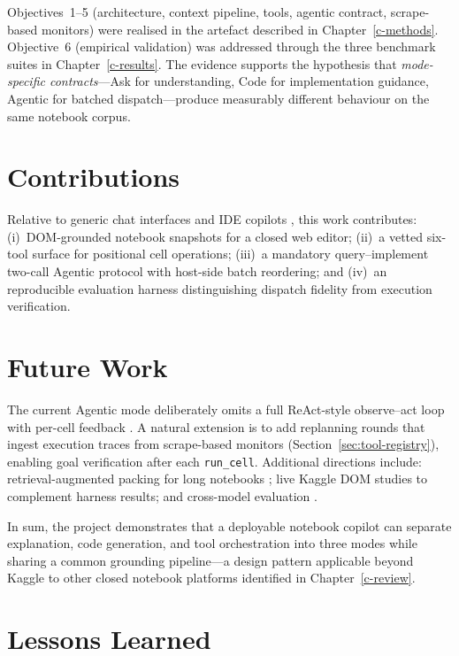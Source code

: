 Objectives~1--5 (architecture, context pipeline, tools, agentic contract, scrape-based monitors) were realised in the artefact described in Chapter~\ref{c-methods}. Objective~6 (empirical validation) was addressed through the three benchmark suites in Chapter~\ref{c-results}. The evidence supports the hypothesis that \emph{mode-specific contracts}---Ask for understanding, Code for implementation guidance, Agentic for batched dispatch---produce measurably different behaviour on the same notebook corpus.

\section{Contributions}

Relative to generic chat interfaces and IDE copilots \parencite{ziegler2024copilot,vaithilingam2022expectation}, this work contributes: (i)~DOM-grounded notebook snapshots for a closed web editor; (ii)~a vetted six-tool surface for positional cell operations; (iii)~a mandatory query--implement two-call Agentic protocol with host-side batch reordering; and (iv)~an reproducible evaluation harness distinguishing dispatch fidelity from execution verification.

\section{Future Work}
\label{sec:future-react}

The current Agentic mode deliberately omits a full ReAct-style observe--act loop with per-cell feedback \parencite{yao2023react,shinn2023reflexion}. A natural extension is to add replanning rounds that ingest execution traces from scrape-based monitors (Section~\ref{sec:tool-registry}), enabling goal verification after each \texttt{run\_cell}. Additional directions include: retrieval-augmented packing for long notebooks \parencite{lewis2020rag,jiang2023structgpt}; live Kaggle \ac{DOM} studies to complement harness results; and cross-model evaluation \parencite{hou2024llm4se,openai2023gpt4}.

In sum, the project demonstrates that a deployable notebook copilot can separate explanation, code generation, and tool orchestration into three modes while sharing a common grounding pipeline---a design pattern applicable beyond Kaggle to other closed notebook platforms identified in Chapter~\ref{c-review}.

\section{Lessons Learned}
\label{sec:lessons}

